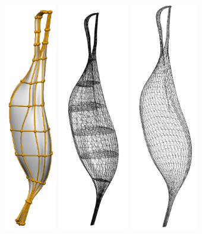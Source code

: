 \begin{figure}%
  \centering%
  \includegraphics[height=10cm]{images/fiber_creation/exfile_red.png}\quad%
  \includegraphics[height=10cm]{images/fiber_creation/biceps23.png}%
  \includegraphics[height=10cm]{images/fiber_creation/biceps22.png}%

\end{figure}
